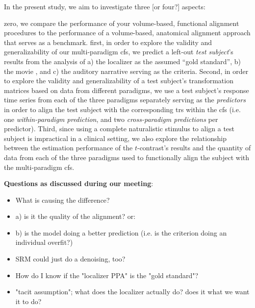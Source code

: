 

In the present study, we aim to investigate three [or four?] aspects:

zero, we compare the performance of your volume-based, functional alignment
procedures to the performance of a volume-based, anatomical alignment approach
that serves as a benchmark.
first, in order to explore the validity and generalizability of our
multi-paradigm \ac{cfs}, we predict a left-out \textit{test subject}'s results
from the analysis of
%
a) the localizer \citep{sengupta2016extension} as the assumed ``gold standard'',
%
b) the movie \citep{haeusler2022processing}, and
%
c) the auditory narrative \citep{haeusler2022processing}
%
serving as the criteria.
Second, in order to explore the validity and generalizability of a test
subject's transformation matrices based on data from different paradigms, we use
a test subject's response time series from each of the three paradigms
separately serving as the \textit{predictors} in order to align the test
subject with the corresponding \acp{tr} within the \ac{cfs} (i.e. one
\textit{within-paradigm prediction}, and two \textit{cross-paradigm predictions}
per predictor).
Third, since using a complete naturalistic stimulus to align a test subject is
impractical in a clinical setting, we also explore the relationship between the
estimation performance of the $t$-contrast's results and the quantity of data
from each of the three paradigms used to functionally align the subject with the
multi-paradigm \ac{cfs}.


\textbf{Questions as discussed during our meeting}:
\begin{itemize}

\item What is causing the difference?

\item a) is it the quality of the alignment? or:

\item b) is the model doing a better prediction
    (i.e. is the criterion doing an individual overfit?)

\item SRM could just do a denoising, too?

\item How do I know if the "localizer PPA" is the "gold standard"?

\item "tacit assumption"; what does the localizer actually do?
    does it what we want it to do?

\end{itemize}


